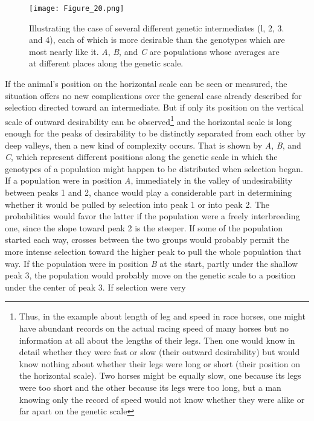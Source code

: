 \begin{figure}
	\centering
    \texttt{[image: Figure\_20.png]}
    \caption{Illustrating the case of several different genetic intermediates (l, 2, 3.
			 and 4), each of which is more desirable than the genotypes which are most nearly like
			 it. \textit{A}, \textit{B}, and \textit{C} are populations whose averages are at 
			 different places along the genetic scale.}
    \label{fig:Lush_Figure_20}
\end{figure}

If the animal's position on the horizontal scale can be seen or measured,
the situation offers no new complications over the general case
already described for selection directed toward an intermediate. But if
only its position on the vertical scale of outward desirability can be
observed\footnote{Thus, in the example about length of leg and speed in race horses, one might
have abundant records on the actual racing speed of many horses but no information
at all about the lengths of their legs. Then one would know in detail whether they
were fast or slow (their outward desirability) but would know nothing about whether
their legs were long or short (their position on the horizontal scale). Two horses
might be equally slow, one because its legs were too short and the other because its
legs were too long, but a man knowing only the record of speed would not know
whether they were alike or far apart on the genetic scale} and the horizontal scale
is long enough for the peaks of desirability to be distinctly separated from each
other by deep valleys, then a new kind of complexity occurs. That is shown by \textit{A}, \textit{B}, and \textit{C},
which represent different positions along the genetic scale in which the
genotypes of a population might happen to be distributed when selection
began. If a population were in position \textit{A}, immediately in the valley
of undesirability between peaks 1 and 2, chance would play a
considerable part in determining whether it would be pulled by selection
into peak 1 or into peak 2. The probabilities would favor the latter
if the population were a freely interbreeding one, since the slope
toward peak 2 is the steeper. If some of the population started each
way, crosses between the two groups would probably permit the more
intense selection toward the higher peak to pull the whole population
that way. If the population were in position \textit{B} at the start, partly under
the shallow peak 3, the population would probably move on the genetic
scale to a position under the center of peak 3. If selection were very
